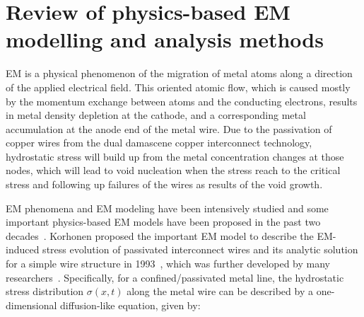 \section{Review of physics-based EM modelling and analysis methods}
\label{sec:reliability_modeling}

EM is a physical phenomenon of the migration of metal atoms along a
direction of the applied electrical field. This oriented atomic flow,
which is caused mostly by the momentum exchange between atoms and the
conducting electrons, results in metal density depletion at the
cathode, and a corresponding metal accumulation at the anode end of
the metal wire. Due to the passivation of copper wires from the dual
damascene copper interconnect technology, hydrostatic stress will
build up from the metal concentration changes at those nodes, which
will lead to void nucleation when the stress reach to the critical
stress and following up failures of the wires as results of the void
growth.

EM phenomena and EM modeling have been intensively studied and some
important physics-based EM models have been proposed in the past two
decades~\cite{deOrio:2010}. Korhonen proposed the important EM model
to describe the EM-induced stress evolution of passivated interconnect
wires and its analytic solution for a simple wire structure in
1993~\cite{Korhonen:jap1993}, which was further developed by many
researchers~\cite{Clement:1999tcad, Sukharev:2015jap}. Specifically,
for a confined/passivated metal line, the hydrostatic stress
distribution $\sigma(x,t)$ along the metal wire can be described by a
one-dimensional diffusion-like equation, given
by:~\cite{Korhonen:jap1993}
%

